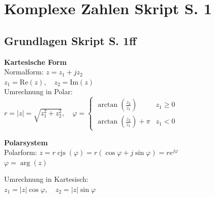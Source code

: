 \newcommand{\titleinfo}{Komplexe Zahlen, Fourierreihen - Formelsammlung}
\newcommand{\authorinfo}{F. Braun, L. Schmid, U. Giger, R. Koller, E. Ammann, S.Arnold, C.Gwerder, S.K\"orner, L.Leuenberger}
\newcommand{\versioninfo}{$Revision: 878 $ - powered by \LaTeX}


\newcommand{\verweis}[2]{\small{(siehe auch \ref{#1}, #2 (S. \pageref{#1}))}}

\newcommand{\skriptsection}[2]{\section{#1 {\tiny Skript S. #2}}}
\newcommand{\skriptsubsection}[2]{\subsection{#1 {\tiny Skript S. #2}}}
\newcommand{\skriptsubsubsection}[2]{\subsubsection{#1 {\tiny Skript S. #2}}}

\DeclareMathOperator{\cjs}{cjs}
\DeclareMathOperator{\Ln}{Ln}



\setlength{\parindent}{0pt}

\skriptsection{Komplexe Zahlen}{1}
\skriptsubsection{Grundlagen}{1ff}
\begin{minipage}[t]{9.4cm}
	\textbf{Kartesische Form}\\
	Normalform: $z = z_1 +j z_2$\\
	$z_1 = \text{Re}(z), \quad z_2 = \text{Im}(z)$\\
	Umrechnung in Polar:\\
	$r = |z| = \sqrt{z_1^2 + z_2^2}, \quad 
	\varphi = 	\begin{cases} 
                	\arctan(\frac{z_2}{z_1}) &z_1 \geq 0\\
                	\arctan(\frac{z_2}{z_1}) + \pi &z_1 < 0
    			\end{cases}$
\end{minipage}
\begin{minipage}[t]{9.4cm}
	\textbf{Polarsystem}\\
	Polarform: 
	$z = r \cjs(\varphi) = r(\cos{\varphi} + j\sin{\varphi}) = r e^{j \varphi}$\\
	$\varphi = \arg(z)$

	Umrechnung in Kartesisch:\\
	$z_1 = |z| \cos{\varphi}, \quad z_2 = |z| \sin{\varphi}$
\end{minipage}

